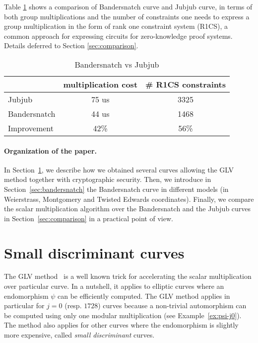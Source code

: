 \documentclass{article}
\theoremstyle{definition}
\begin{document}
Table \ref{tab:comp} shows a comparison of Bandersnatch curve
and Jubjub curve, in terms of both group multiplications and 
the number of constraints one needs to express a group multiplication
in the form of rank one constraint system (R1CS), 
a common approach for expressing circuits for zero-knowledge 
proof systems. Details deferred to Section \ref{sec:comparison}.

\begin{table}[h] %
  \centering
  
  \begin{tabular}{|l|c|c|}\hline
      & multiplication cost & \# R1CS constraints \\\hline\hline
    Jubjub & 75 us & 3325 \\\hline
    Bandersnatch & 44 us & 1468 \\\hline\hline   
    Improvement & 42\% & 56\%\\\hline
  \end{tabular}
  \caption{Bandersnatch vs Jubjub}
  \label{tab:comp}
\end{table}



\paragraph{Organization of the paper.}
In Section~\ref{sec:small-disc-curves}, we describe how we obtained
several curves allowing the GLV method together with cryptographic
security.
Then, we introduce in Section~\ref{sec:bandersnatch} the Bandersnatch
curve in different models (in Weierstrass, Montgomery and Twisted Edwards
coordinates).
Finally, we compare the scalar multiplication algorithm over
the Bandersnatch and the Jubjub curves in
Section~\ref{sec:comparison} in a practical point of view.


\section{Small discriminant curves}\label{sec:small-disc-curves}

The GLV method~\cite{C:GalLamVan01} is a well known trick for accelerating the
scalar multiplication over particular curve. In a nutshell, it applies
to elliptic curves where an endomorphism $\psi$ can be efficiently computed.
The GLV method applies in particular for $j=0$ (resp. $1728$) curves
because a non-trivial automorphism can be computed using only one
modular multiplication (see Example~\ref{ex:psi-j0}).
The method also applies for other curves where the endomorphism is
slightly more expensive, called \emph{small discriminant} curves.
\end{document}
